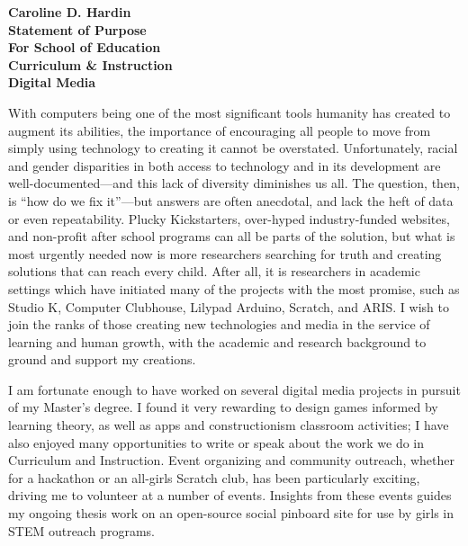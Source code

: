 \documentclass[12pt]{letter}
\newcommand{\ignore}[2]{\hspace{0in}#2} %
\begin{document}
\begin{letter}

\noindent 
\large\textbf{Caroline D. Hardin\\
Statement of Purpose\\
For School of Education\\
Curriculum \& Instruction\\
Digital Media
}
\vfill


\signature{Caroline D. Hardin} %


With computers being one of the most significant tools humanity has created to augment its abilities, the importance of encouraging all people to move from simply using technology to creating it cannot be overstated. Unfortunately, racial and gender disparities in both access to technology and in its development are well-documented---and this lack of diversity diminishes us all. The question, then, is ``how do we fix it''---but answers are often anecdotal, and lack the heft of data or even repeatability. Plucky Kickstarters, over-hyped industry-funded websites, and non-profit after school programs can all be parts of the solution, but what is most urgently needed now is more researchers searching for truth and creating solutions that can reach every child. After all, it is researchers in academic settings which have initiated many of the projects with the most promise, such as Studio K, Computer Clubhouse, Lilypad Arduino, Scratch, and ARIS. \ignore{I just don't think you can pretend not to know Scratch with a straight face.} I wish to join the ranks of those creating new technologies and media in the service of learning and human growth, with the academic and research background to ground and support my creations.

I am fortunate enough to have worked on several digital media projects in pursuit of my Master's degree. I found it very rewarding to design games informed by learning theory, as well as apps and constructionism classroom activities; I have also enjoyed many opportunities to write or speak about the work we do in Curriculum and Instruction. \ignore{why is this (C\&I) capitalized? ---BFO} Event organizing and community outreach, whether for a hackathon or an all-girls Scratch club, has been particularly exciting, driving me to volunteer at a number of events. Insights from these events guides my ongoing thesis work on an open-source social pinboard site for use by girls in STEM outreach programs.


\end{letter}
\end{document}

